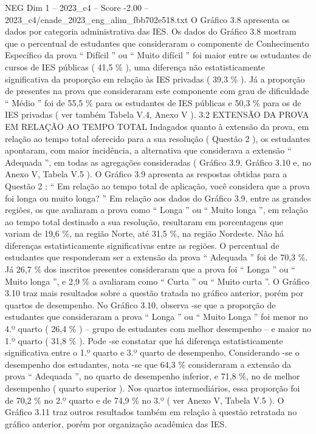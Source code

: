 \begin{textsample}{NEG Dim 1 – 2023\_c4 – Score -2.00 – 2023\_c4/enade\_2023\_eng\_alim\_fbb702e518.txt}
O Gráfico 3.8 apresenta os dados por categoria administrativa das IES.
Os dados do Gráfico 3.8 mostram que o percentual de estudantes que consideraram o componente de Conhecimento Específico da prova “ Difícil ” ou “ Muito difícil ” foi maior entre os estudantes de cursos de IES públicas ( 41,5 \% ), uma diferença não estatisticamente significativa da proporção em relação às IES privadas ( 39,3 \% ).
Já a proporção de presentes na prova que consideraram este componente com grau de dificuldade “ Médio ” foi de 55,5 \% para os estudantes de IES públicas e 50,3 \% para os de IES privadas ( ver também Tabela V.4, Anexo V ). 3.2 EXTENSÃO DA PROVA EM RELAÇÃO AO TEMPO TOTAL Indagados quanto à extensão da prova, em relação ao tempo total oferecido para a sua resolução ( Questão 2 ), os estudantes apontaram, com maior incidência, a alternativa que considerava a extensão “ Adequada ”, em todas as agregações consideradas ( Gráfico 3.9, Gráfico 3.10 e, no Anexo V, Tabela V.5 ).
O Gráfico 3.9 apresenta as respostas obtidas para a Questão 2 : “ Em relação ao tempo total de aplicação, você considera que a prova foi longa ou muito longa? ” Em relação aos dados do Gráfico 3.9, entre as grandes regiões, os que avaliaram a prova como “ Longa ” ou “ Muito longa ”, em relação ao tempo total destinado a sua resolução, resultaram em porcentagens que variam de 19,6 \%, na região Norte, até 31,5 \%, na região Nordeste.
Não há diferenças estatisticamente significativas entre as regiões.
O percentual de estudantes que responderam ser a extensão da prova “ Adequada ” foi de 70,3 \%.
Já 26,7 \% dos inscritos presentes consideraram que a prova foi “ Longa ” ou “ Muito longa ”, e 2,9 \% a avaliaram como “ Curta ” ou “ Muito curta ”.
O Gráfico 3.10 traz mais resultados sobre a questão tratada no gráfico anterior, porém por quartos de desempenho.
No Gráfico 3.10, observa -se que a proporção de estudantes que consideraram a prova “ Longa ” ou “ Muito Longa ” foi menor no 4.º quarto ( 26,4 \% ) – grupo de estudantes com melhor desempenho – e maior no 1.º quarto ( 31,8 \% ).
Pode -se constatar que há diferença estatisticamente significativa entre o 1.º quarto e 3.º quarto de desempenho.
Considerando -se o desempenho dos estudantes, nota -se que 64,3 \% consideraram a extensão da prova “ Adequada ”, no quarto de desempenho inferior, e 71,8 \%, no de melhor desempenho ( quarto superior ).
Nos quartos intermediários, essa proporção foi de 70,2 \% no 2.º quarto e de 74,9 \% no 3.º ( ver Anexo V, Tabela V.5 ).
O Gráfico 3.11 traz outros resultados também em relação à questão retratada no gráfico anterior, porém por organização acadêmica das IES.

\end{textsample}

